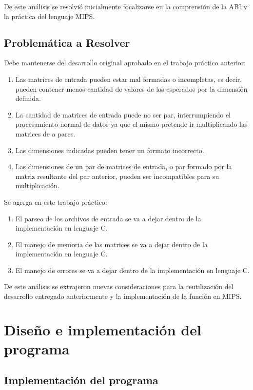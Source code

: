 \documentclass[a4paper,10pt]{article}
\begin{document}
De este an\'alisis se resolvi\'o inicialmente focalizarse en la comprensi\'on de la ABI y la pr\'actica del lenguaje MIPS.

\subsection{Problem\'atica a Resolver}
Debe mantenerse del desarrollo original aprobado en el trabajo pr\'actico anterior:
\begin{enumerate}
\item Las matrices de entrada pueden estar mal formadas o incompletas, es decir, pueden contener menos cantidad de valores de los esperados por la dimensi\'on definida.
\item La cantidad de matrices de entrada puede no ser par, interrumpiendo el procesamiento normal de datos ya que el mismo pretende ir multiplicando las matrices de a pares.
\item Las dimensiones indicadas pueden tener un formato incorrecto.
\item Las dimensiones de un par de matrices de entrada, o par formado por la matriz resultante del par anterior, pueden ser incompatibles para su multiplicaci\'on.
\end{enumerate}

Se agrega en este trabajo pr\'actico:
\begin{enumerate}
\item El parseo de los archivos de entrada se va a dejar dentro de la implementaci\'on en lenguaje C.
\item El manejo de memoria de las matrices se va a dejar dentro de la implementaci\'on en lenguaje C.
\item El manejo de errores se va a dejar dentro de la implementaci\'on en lenguaje C.
\end{enumerate}

De este an\'alisis se extrajeron nuevas consideraciones para la reutilizaci\'on del desarrollo entregado anteriormente y la implementaci\'on de la funci\'on en MIPS.

\newpage

\section{Diseño e implementaci\'on del programa}


\subsection{Implementaci\'on del programa}
\end{document}
